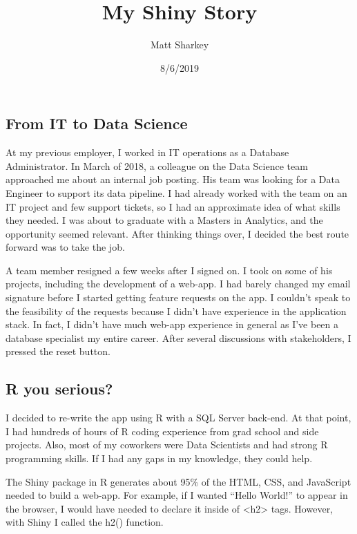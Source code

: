 \documentclass[]{article}
\title{My Shiny Story}
\author{Matt Sharkey}
\date{8/6/2019}
\begin{document}
\maketitle

\hypertarget{from-it-to-data-science}{%
\subsection{From IT to Data Science}\label{from-it-to-data-science}}

At my previous employer, I worked in IT operations as a Database
Administrator. In March of 2018, a colleague on the Data Science team
approached me about an internal job posting. His team was looking for a
Data Engineer to support its data pipeline. I had already worked with
the team on an IT project and few support tickets, so I had an
approximate idea of what skills they needed. I was about to graduate
with a Masters in Analytics, and the opportunity seemed relevant. After
thinking things over, I decided the best route forward was to take the
job.

A team member resigned a few weeks after I signed on. I took on some of
his projects, including the development of a web-app. I had barely
changed my email signature before I started getting feature requests on
the app. I couldn't speak to the feasibility of the requests because I
didn't have experience in the application stack. In fact, I didn't have
much web-app experience in general as I've been a database specialist my
entire career. After several discussions with stakeholders, I pressed
the reset button.

\hypertarget{r-you-serious}{%
\subsection{R you serious?}\label{r-you-serious}}

I decided to re-write the app using R with a SQL Server back-end. At
that point, I had hundreds of hours of R coding experience from grad
school and side projects. Also, most of my coworkers were Data
Scientists and had strong R programming skills. If I had any gaps in my
knowledge, they could help.

The Shiny package in R generates about 95\% of the HTML, CSS, and
JavaScript needed to build a web-app. For example, if I wanted ``Hello
World!'' to appear in the browser, I would have needed to declare it
inside of \textless{}h2\textgreater{} tags. However, with Shiny I called
the h2() function.
\end{document}
